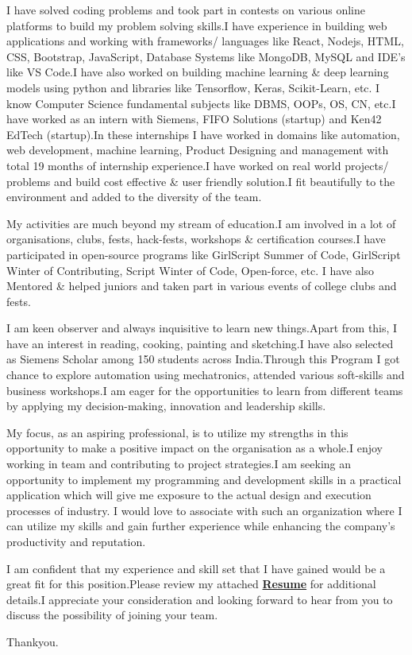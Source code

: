\documentclass[11pt,a4]{article}
\begin{document}
I have solved coding problems and took part in contests on various online platforms to build my problem solving skills.I have experience in building web applications and working with frameworks/ languages like React, Nodejs, HTML, CSS, Bootstrap, JavaScript, Database Systems like MongoDB, MySQL and IDE's like VS Code.I have also worked on building machine learning \& deep learning models using python and libraries like Tensorflow, Keras, Scikit-Learn, etc. I know Computer Science fundamental subjects like DBMS, OOPs, OS, CN, etc.I have worked as an intern with Siemens, FIFO Solutions (startup) and Ken42 EdTech (startup).In these internships I have worked in domains like automation, web development, machine learning, Product Designing and management with total 19 months of internship experience.I have worked on real world projects/ problems and build cost effective \& user friendly solution.I fit beautifully to the environment and added to the diversity of the team.\par

My activities are much beyond my stream of education.I am involved in a lot of organisations, clubs, fests, hack-fests, workshops \& certification courses.I have participated in open-source programs like GirlScript Summer of Code, GirlScript Winter of Contributing, Script Winter of Code, Open-force, etc. I have also Mentored \& helped juniors and taken part in various events of college clubs and fests.\par 

I am keen observer and always inquisitive to learn new things.Apart from this, I have an interest in reading, cooking, painting and sketching.I have also selected as Siemens Scholar among 150 students across India.Through this Program I got chance to explore automation using mechatronics, attended various soft-skills and business workshops.I am eager for the opportunities to learn from different teams by applying my decision-making, innovation and leadership skills.\par

My focus, as an aspiring professional, is to utilize my strengths in this opportunity to make a positive impact on the organisation as a whole.I enjoy working in team and contributing to project strategies.I am seeking an opportunity to implement my programming and development skills in a practical application which will give me exposure to the actual design and execution processes of industry. I would love to associate with such an organization where I can utilize my skills and gain further experience while enhancing the company’s productivity and reputation.\par

I am confident that my experience and skill set that I have gained would be a great fit for this position.Please review my attached \href{https://drive.google.com/file/d/1kzRAjBxObR_zcMgENjn0aBw7xcJmGxGt/view}{\textbf{Resume}} for additional details.I appreciate your consideration and looking forward to hear from you to discuss the possibility of joining your team.\par

Thankyou.
\end{document}
